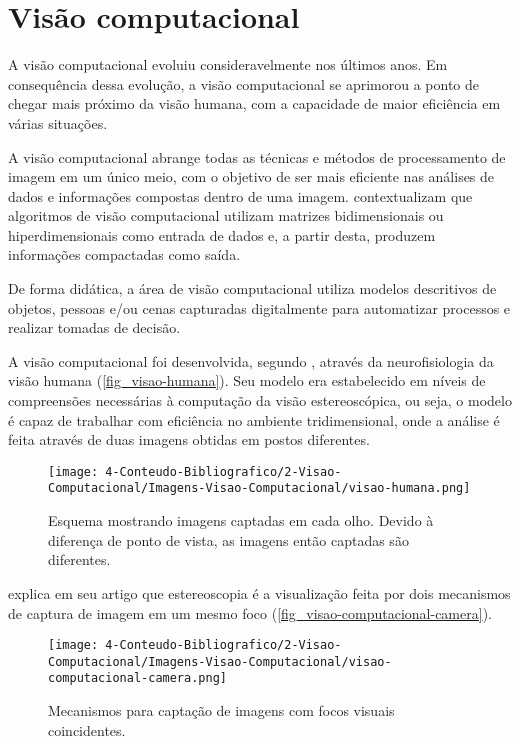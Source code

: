\section{\textbf{{Visão computacional}}}
\label{visao-computacional}

A visão computacional evoluiu consideravelmente nos últimos anos. Em consequência dessa evolução, a visão computacional se aprimorou a ponto de chegar mais próximo da visão humana, com a capacidade de maior eficiência em várias situações.

A visão computacional abrange todas as técnicas e métodos de processamento de imagem em um único meio, com o objetivo de ser mais eficiente nas análises de dados e informações compostas dentro de uma imagem.  contextualizam que algoritmos de visão computacional utilizam matrizes bidimensionais ou hiperdimensionais como entrada de dados e, a partir desta, produzem informações compactadas como saída.

De forma didática, a área de visão computacional utiliza modelos descritivos de objetos, pessoas e/ou cenas capturadas digitalmente para automatizar processos e realizar tomadas de decisão.

A visão computacional foi desenvolvida, segundo , através da neurofisiologia da visão humana (\autoref{fig_visao-humana}). Seu modelo era estabelecido em níveis de compreensões necessárias à computação da visão estereoscópica, ou seja, o modelo é capaz de trabalhar com eficiência no ambiente tridimensional, onde a análise é feita através de duas imagens obtidas em postos diferentes.

\begin{figure}[h]
	\caption{\label{fig_visao-humana}Esquema mostrando imagens captadas em cada olho. Devido à diferença de
ponto de vista, as imagens então captadas são diferentes.}
	\begin{center}
		\texttt{[image: 4-Conteudo-Bibliografico/2-Visao-Computacional/Imagens-Visao-Computacional/visao-humana.png]}
	\end{center}
	\centering {}
\end{figure}

 explica em seu artigo que estereoscopia é a visualização feita por dois mecanismos de captura de imagem em um mesmo foco (\autoref{fig_visao-computacional-camera}).

\begin{figure}[ht]
	\caption{\label{fig_visao-computacional-camera}Mecanismos para captação de imagens com focos visuais coincidentes.}
	\begin{center}
		\texttt{[image: 4-Conteudo-Bibliografico/2-Visao-Computacional/Imagens-Visao-Computacional/visao-computacional-camera.png]}
	\end{center}
	\centering {}
\end{figure}

